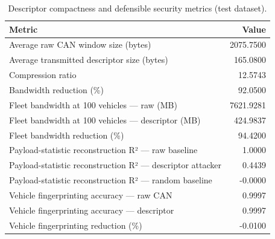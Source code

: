 \begin{table}[t]
\centering
\begin{tabular}{lr}
\toprule
Metric & Value \\
\midrule
Average raw CAN window size (bytes) & 2075.7500 \\
Average transmitted descriptor size (bytes) & 165.0800 \\
Compression ratio & 12.5743 \\
Bandwidth reduction (\%) & 92.0500 \\
Fleet bandwidth at 100 vehicles — raw (MB) & 7621.9281 \\
Fleet bandwidth at 100 vehicles — descriptor (MB) & 424.9837 \\
Fleet bandwidth reduction (\%) & 94.4200 \\
Payload-statistic reconstruction R² — raw baseline & 1.0000 \\
Payload-statistic reconstruction R² — descriptor attacker & 0.4439 \\
Payload-statistic reconstruction R² — random baseline & -0.0000 \\
Vehicle fingerprinting accuracy — raw CAN & 0.9997 \\
Vehicle fingerprinting accuracy — descriptor & 0.9997 \\
Vehicle fingerprinting reduction (\%) & -0.0100 \\
\bottomrule
\end{tabular}
\caption{Descriptor compactness and defensible security metrics (test dataset).}
\label{tab:descriptor-security}
\end{table}
